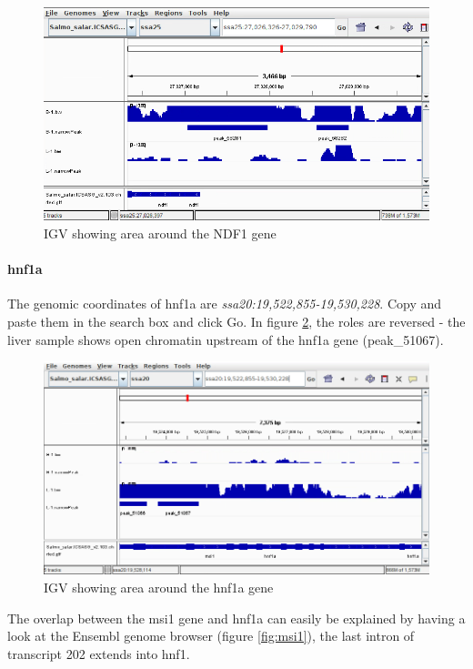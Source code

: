 \documentclass[12pt]{article}
\begin{document}
			\begin{figure}[H]
				\includegraphics[width=\textwidth]{ndf1.png}
				\caption{IGV showing area around the NDF1 gene}
				\label{fig:ndf1}	
			\end{figure}
			
			\paragraph{hnf1a}
			The genomic coordinates of hnf1a are  \textit{ssa20:19,522,855-19,530,228}. 
			Copy and paste them in the search box and click Go. 
			In figure \ref{fig:hnf1a}, the roles are reversed - the liver sample shows open chromatin upstream of the hnf1a gene (peak\_51067).
		
			\begin{figure}[H]
				\includegraphics[width=\textwidth]{hnf1a.png}
				\caption{IGV showing area around the hnf1a gene}
				\label{fig:hnf1a}		
			\end{figure}
			
			The overlap between the msi1 gene and hnf1a can easily be explained by having a look at the Ensembl genome browser (figure \ref{fig:msi1}), the last intron of transcript 202 extends into hnf1.
			
\end{document}
